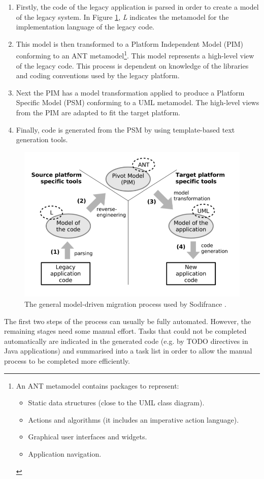 \documentclass{UoYCSproject}
\begin{document}
\begin{enumerate}
\item Firstly, the code of the legacy application is parsed in order to create a model of the legacy system. In Figure \ref{fig:sodifrance_process}, \textit{L} indicates the metamodel for the implementation language of the legacy code.
\item This model is then transformed to a Platform Independent Model (PIM) conforming to an ANT metamodel\footnote{An ANT metamodel contains packages to represent:
\begin{itemize}
\item Static data structures (close to the UML class diagram).
\item Actions and algorithms (it includes an imperative action language).
\item Graphical user interfaces and widgets.
\item Application navigation.
\end{itemize}}. This model represents a high-level view of the legacy code. This process is dependent on knowledge of the libraries and coding conventions used by the legacy platform.
\item Next the PIM has a model transformation applied to produce a Platform Specific Model (PSM) conforming to a UML metamodel. The high-level views from the PIM are adapted to fit the target platform.
\item Finally, code is generated from the PSM by using template-based text generation tools.
\end{enumerate}

\begin{figure}[h!]
  \centering
  \includegraphics[width=0.6\linewidth]{graphics/sodifrance_mde.png}
  \caption{The general model-driven migration process used by Sodifrance \parencite{fleurey2007model}.}
  \label{fig:sodifrance_process}
\end{figure}

The first two steps of the process can usually be fully automated. However, the remaining stages need some manual effort. Tasks that could not be completed automatically are indicated in the generated code (e.g. by TODO directives in Java applications) and summarised into a task list in order to allow the manual process to be completed more efficiently.
\end{document}
